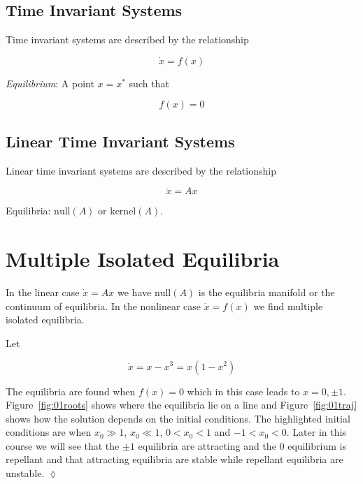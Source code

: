 \subsection{Time Invariant Systems}
Time invariant systems are described by the relationship

\begin{equation*}
\dot{x}=f(x)
\end{equation*}

\begin{definition}
\textit{Equilibrium}: A point $x=x^\ast$ such that

\begin{equation*}
f(x) = 0
\end{equation*}

\end{definition}

\subsection{Linear Time Invariant Systems}
Linear time invariant systems are described by the relationship

\begin{equation*}
\dot{x}=Ax
\end{equation*}

\begin{definition}
Equilibria: $\text{null}(A)$ or $\text{kernel}(A)$.
\end{definition}

\section{Multiple Isolated Equilibria}
In the linear case $\dot{x}=Ax$ we have $\text{null}(A)$ is the equilibria manifold or the continuum of equilibria.
In the nonlinear case $\dot{x}=f(x)$ we find multiple isolated equilibria.
\begin{example}
Let

\begin{equation*}
\dot{x} = x-x^3 = x(1-x^2)
\end{equation*}

The equilibria are found when $f(x)=0$ which in this case leads to $x=0,\pm1$.
Figure~\ref{fig:01roots} shows where the equilibria lie on a line and Figure~\ref{fig:01traj} shows how the solution depends on the initial conditions.
The highlighted initial conditions are when $x_0\gg1$, $x_0\ll1$, $0<x_0<1$ and $-1<x_0<0$.
Later in this course we will see that the $\pm1$ equilibria are attracting and the $0$ equilibrium is repellant and that attracting equilibria are stable while repellant equilibria are unstable.
$\lozenge$
\end{example}

